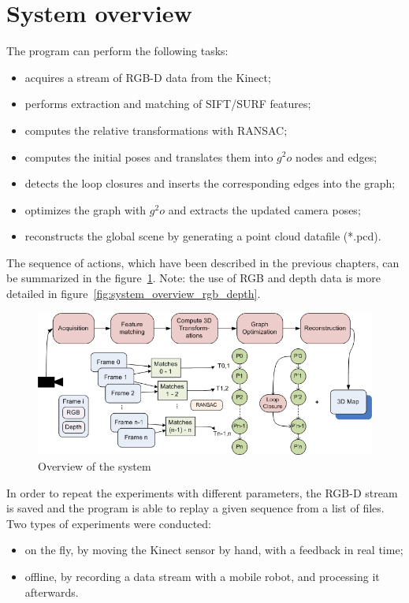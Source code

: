 \section{System overview}

The program can perform the following tasks:

\begin{itemize}
\item acquires a stream of RGB-D data from the Kinect;
\item performs extraction and matching of SIFT/SURF features;
\item computes the relative transformations with \gls{RANSAC};
\item computes the initial poses and translates them into $g^2o$ nodes and edges;
\item detects the loop closures and inserts the corresponding edges into the graph;
\item optimizes the graph with $g^2o$ and extracts the updated camera poses;
\item reconstructs the global scene by generating a point cloud datafile (*.pcd).
\end{itemize}

The sequence of actions, which have been described in the previous chapters, can be summarized in the figure~\ref{fig:system_overview}. Note: the use of RGB and depth data is more detailed in figure~\ref{fig:system_overview_rgb_depth}. 

\clearpage
\begin{figure}[h!]
\begin{center}
\includegraphics[width=1\textwidth]{figures/overview}
\caption{Overview of the system}
\label{fig:system_overview}
\end{center}
\end{figure}

In order to repeat the experiments with different parameters, the RGB-D stream is saved and the program is able to replay a given sequence from a list of files. Two types of experiments were conducted:
\begin{itemize}
\item on the fly, by moving the Kinect sensor by hand, with a feedback in real time;
\item offline, by recording a data stream with a mobile robot, and processing it afterwards. 
\end{itemize}

